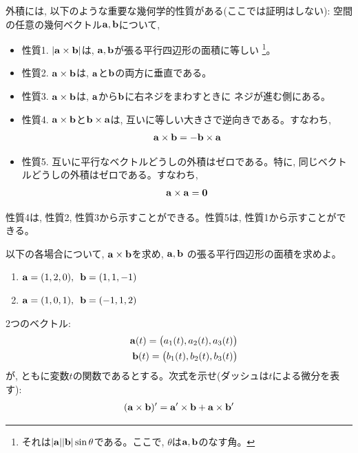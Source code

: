 外積には, 以下のような重要な幾何学的性質がある(ここでは証明はしない): 空間の任意の幾何ベクトル${\bf a}, {\bf b}$について, 
\begin{itemize}
\item 性質1. $|{\bf a}\times{\bf b}|$は, ${\bf a}, {\bf b}$が張る平行四辺形の面積に等しい
\footnote{それは$|{\bf a}||{\bf b}|\sin\theta$である。ここで, $\theta$は${\bf a}, {\bf b}$のなす角。}。
\item 性質2. ${\bf a}\times{\bf b}$は, ${\bf a}$と${\bf b}$の両方に垂直である。
\item 性質3. ${\bf a}\times{\bf b}$は, ${\bf a}$から${\bf b}$に右ネジをまわすときに
ネジが進む側にある。
\item 性質4. ${\bf a}\times{\bf b}$と${\bf b}\times{\bf a}$は, 互いに等しい大きさで逆向きである。すなわち, 
\begin{eqnarray}{\bf a}\times{\bf b}=-{\bf b}\times{\bf a}\end{eqnarray}
\item 性質5. 互いに平行なベクトルどうしの外積はゼロである。特に, 同じベクトルどうしの外積はゼロである。すなわち, 
\begin{eqnarray}{\bf a}\times{\bf a}={\bf 0}\end{eqnarray}
\end{itemize}

性質4は, 性質2, 性質3から示すことができる。性質5は, 性質1から示すことができる。\mv

\begin{q}\label{q:univ_vectprod0_phys} 以下の各場合について, ${\bf a}\times{\bf b}$を求め, ${\bf a}, {\bf b}$
の張る平行四辺形の面積を求めよ。
\begin{enumerate}
\item ${\bf a}=(1, 2, 0),\,\,\, {\bf b}=(1, 1, -1)$
\item ${\bf a}=(1, 0, 1),\,\,\, {\bf b}=(-1, 1, 2)$
\end{enumerate}\end{q}
\mv

\begin{q}\label{q:vect_vecprod_diff_phys} 2つのベクトル: 
\begin{eqnarray*}
&&{\bf a}(t)=\bigl(a_1(t), a_2(t), a_3(t)\bigr)\\
&&{\bf b}(t)=\bigl(b_1(t), b_2(t), b_3(t)\bigr)
\end{eqnarray*}
が, ともに変数$t$の関数であるとする。次式を示せ(ダッシュは$t$による微分を表す):
\begin{eqnarray}
({\bf a}\times{\bf b})'={\bf a}'\times{\bf b}+{\bf a}\times{\bf b}'\label{eq:vect_vecprod_diff_phys}
\end{eqnarray}
\end{q}
\hv


